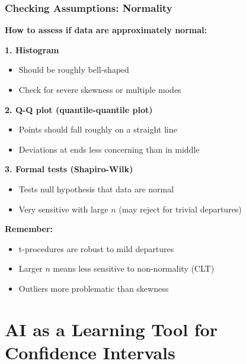 \documentclass{beamer}
\begin{document}
\begin{frame}
\frametitle{Checking Assumptions: Normality}
\textbf{How to assess if data are approximately normal:}

\vspace{0.3cm}
\textbf{1. Histogram}
\begin{itemize}
\item Should be roughly bell-shaped
\item Check for severe skewness or multiple modes
\end{itemize}

\vspace{0.3cm}
\textbf{2. Q-Q plot (quantile-quantile plot)}
\begin{itemize}
\item Points should fall roughly on a straight line
\item Deviations at ends less concerning than in middle
\end{itemize}

\vspace{0.3cm}
\textbf{3. Formal tests (Shapiro-Wilk)}
\begin{itemize}
\item Tests null hypothesis that data are normal
\item Very sensitive with large $n$ (may reject for trivial departures)
\end{itemize}

\vspace{0.3cm}
\textbf{Remember:}
\begin{itemize}
\item t-procedures are robust to mild departures
\item Larger $n$ means less sensitive to non-normality (CLT)
\item Outliers more problematic than skewness
\end{itemize}
\end{frame}

\section{AI as a Learning Tool for Confidence Intervals}
\end{document}

